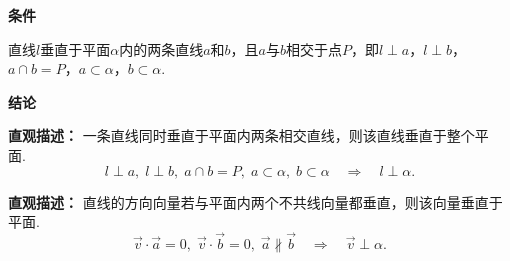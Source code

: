 \begin{statementbox}
	\textbf{\textcolor{CStatement}{条件}}
	\begin{description}[style=nextline, leftmargin=2.8em, labelsep=0.5em, itemsep=0.35em]
		\item[\textbf{\textcolor{CStatement}{条件1（垂于两相交线）：}}]
			直线$l$垂直于平面$\alpha$内的两条直线$a$和$b$，且$a$与$b$相交于点$P$，即$l\perp a$，$l\perp b$，$a\cap b=P$，$a\subset\alpha$，$b\subset\alpha$.
	\end{description}

	\medskip
	\textbf{\textcolor{CStatement}{结论}}
	\begin{description}[style=nextline, leftmargin=2.8em, labelsep=0.5em, itemsep=0.45em]
		\item[\textbf{\textcolor{CStatement}{结论一（线面垂直判定）：}}]
			\textbf{\textcolor{CStatement}{直观描述：}}
			一条直线同时垂直于平面内两条相交直线，则该直线垂直于整个平面.\
			\[
				l\perp a,\; l\perp b,\; a\cap b=P,\; a\subset\alpha,\; b\subset\alpha \quad\Rightarrow\quad l\perp\alpha.
			\]
		\item[\textbf{\textcolor{CStatement}{推广结论（向量等价表述）：}}]
			\textbf{\textcolor{CStatement}{直观描述：}}
			直线的方向向量若与平面内两个不共线向量都垂直，则该向量垂直于平面.\
			\[
				\vec{v}\cdot\vec{a}=0,\; \vec{v}\cdot\vec{b}=0,\; \vec{a}\not\parallel\vec{b} \quad\Rightarrow\quad \vec{v}\perp\alpha.
			\]
	\end{description}

\end{statementbox}
